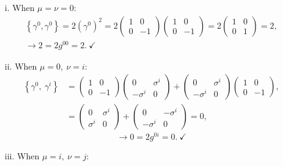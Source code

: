 \begin{enumerate}[leftmargin=0.5in]
    \item[i.] When $\mu=\nu=0$:
        \begin{gather*}
            \left\{\gamma^0, \gamma^0\right\} = 2\left(\gamma^0\right)^2 = 2\begin{pmatrix}1 & 0 \\ 0 & -1\end{pmatrix}\begin{pmatrix}1 & 0 \\ 0 & -1\end{pmatrix} = 2\begin{pmatrix}1 & 0 \\ 0 & 1\end{pmatrix} = 2, \\
            \rightarrow 2 = 2g^{00} = 2.\ \checkmark
        \end{gather*}
    \item[ii.] When $\mu=0,\ \nu=i$:
        \begin{align*}
            \left\{\gamma^0,\ \gamma^i\right\} &= \begin{pmatrix}1 & 0 \\ 0 & -1\end{pmatrix}\begin{pmatrix}0 & \sigma^i \\ -\sigma^i & 0\end{pmatrix} + \begin{pmatrix} 0 & \sigma^i \\ -\sigma^i & 0\end{pmatrix}\begin{pmatrix}1 & 0 \\ 0 & -1\end{pmatrix}, \\
            &= \begin{pmatrix}0 & \sigma^i \\ \sigma^i & 0\end{pmatrix} + \begin{pmatrix}0 & -\sigma^i \\ -\sigma^i & 0\end{pmatrix} = 0,
        \end{align*}
        \begin{equation*}
            \rightarrow 0 = 2g^{0i} = 0.\ \checkmark
        \end{equation*}
    \item[iii.] When $\mu=i,\ \nu=j$:
        \begin{align*}

\end{align*}
\end{enumerate}
